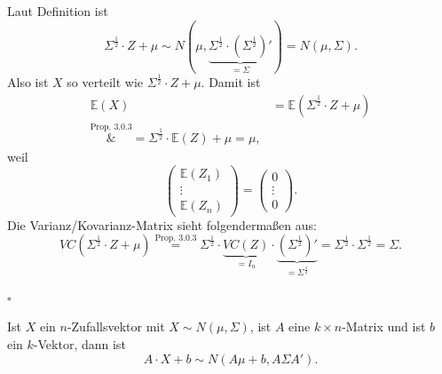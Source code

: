 \documentclass[10pt]{article}
\newcommand{\EW}{\mathbb{E}} %
\newcommand{\halb}{\frac{1}{2}} %
\newenvironment{BWS}[1][]
{\begin{Beweis}[frametitle=#1]}{\end{Beweis}}
\begin{document}
			\begin{BWS}[Beweis 4.0.1 (Varianz/Kovarianz-Matrix)]
				Laut Definition ist
				\begin{equation*}
					\Sigma^{\halb} \cdot Z + \mu \sim N(\mu, \underbrace{\Sigma^{\halb} \cdot (\Sigma^{\halb})'}_{= \Sigma}) = N(\mu, \Sigma).
				\end{equation*}
				Also ist $X$ so verteilt wie $\Sigma^{\halb} \cdot Z + \mu$. 
				Damit ist
				\begin{equation*}
					\begin{split}
						\EW(X) &= \EW(\Sigma^{\halb} \cdot Z + \mu)\\
						\overset{\text{Prop. 3.0.3}}&{=} \Sigma^{\halb} \cdot \EW(Z) + \mu = \mu,
					\end{split}
				\end{equation*}
				weil 
				\begin{equation*}
					\left(
					\begin{array}{c}
						\EW(Z_1)\\
						\vdots\\
						\EW(Z_n)
					\end{array}
					\right) = \left(
					\begin{array}{c}
						0\\
						\vdots\\
						0
					\end{array}
					\right).
				\end{equation*}
				Die Varianz/Kovarianz-Matrix sieht folgendermaßen aus:
				\begin{equation*}
					VC(\Sigma^{\halb} \cdot Z + \mu) \overset{\text{Prop. 3.0.3}}{=} \Sigma^{\halb} \cdot \underbrace{VC(Z)}_{= I_n} \cdot \underbrace{(\Sigma^{\halb})'}_{=\Sigma^{\halb}} = \Sigma^{\halb} \cdot \Sigma^{\halb} = \Sigma.
				\end{equation*}
				\begin{flushright}
					$\square$
				\end{flushright}
			\end{BWS}

            
			\begin{Proposition}
				Ist $X$ ein $n$-Zufallsvektor mit $X \sim N(\mu,\Sigma)$, ist $A$ eine $k \times n$-Matrix und ist $b$ ein $k$-Vektor, dann ist
				\begin{equation*}
					A \cdot X + b \sim N(A\mu + b, A \Sigma A').
				\end{equation*}
			\end{Proposition}
            
\end{document}
